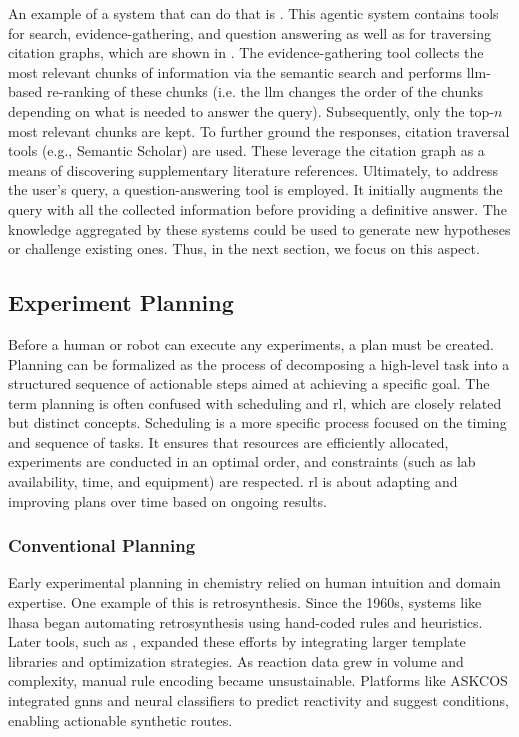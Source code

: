 An example of a system that can do that is . This agentic system contains tools for search, evidence-gathering, and question answering as well as for traversing citation graphs, which are shown in . The evidence-gathering tool collects the most relevant chunks of information via the semantic search and performs \gls{llm}-based re-ranking of these chunks (i.e. the \gls{llm} changes the order of the chunks depending on what is needed to answer the query).
Subsequently, only the top-$n$ most relevant chunks are kept. To further ground the responses, citation traversal tools (e.g., Semantic Scholar\autocite{kinney2023semantic}) are used. 
These leverage the citation graph as a means of discovering supplementary literature references. Ultimately, to address the user's query, a question-answering tool is employed. It initially augments the query with all the collected information before providing a definitive answer.
The knowledge aggregated by these systems could be used to generate new hypotheses or challenge existing ones. 
Thus, in the next section, we focus on this aspect.





\subsection{Experiment Planning}
\label{sec:planning}
Before a human or robot can execute any experiments, a plan must be created. 
Planning can be formalized as the process of decomposing a high-level task into a structured sequence of actionable steps aimed at achieving a specific goal. 
The term planning is often confused with scheduling and \gls{rl}, which are closely related but distinct concepts. Scheduling is a more specific process focused on the timing and sequence of tasks. 
It ensures that resources are efficiently allocated, experiments are conducted in an optimal order, and constraints (such as lab availability, time, and equipment) are respected.\autocite{kambhampati2023llmplanning} 
\gls{rl} is about adapting and improving plans over time based on ongoing results.\autocite{chen2022deep}

\subsubsection{Conventional Planning} 
Early experimental planning in chemistry relied on human intuition and domain expertise. 
One example of this is retrosynthesis. 
Since the 1960s, systems like \gls{lhasa} \autocite{corey1972computer} began automating retrosynthesis using hand-coded rules and heuristics\autocite{warr2014short}. 
Later tools, such as \autocite{grzybowski2018chematica}, expanded these efforts by integrating larger template libraries and optimization strategies. 
As reaction data grew in volume and complexity, manual rule encoding became unsustainable. 
Platforms like ASKCOS\autocite{tu2025askcos} integrated \glspl{gnn} and neural classifiers to predict reactivity and suggest conditions, enabling actionable synthetic routes. 

